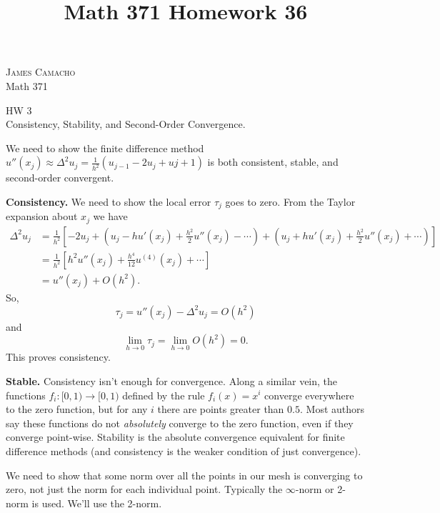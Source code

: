 \documentclass[12pt,oneside]{article}
\begin{document}
	\title{Math 371 Homework 36}
	
	\begin{flushright}
		\textsc{James Camacho}  \\
		Math 371
	\end{flushright}
	\begin{center}
		\textsf{HW 3} \\
		\textsf{Consistency, Stability, and Second-Order Convergence.}
	\end{center}

	We need to show the finite difference method $u''(x_j) \approx \Delta^2u_j =  \frac{1}{h^2}(u_{j-1} - 2u_j + u{j+1})$ is both consistent, stable, and second-order convergent.
	
	\textbf{Consistency.} We need to show the local error $\tau_j$ goes to zero. From the Taylor expansion about $x_j$ we have
	\begin{align*}
	\Delta^2u_j &= \frac{1}{h^2}\left[-2u_j + (u_j - hu'(x_j) + \frac{h^2}{2}u''(x_j) - \cdots) + (u_j + hu'(x_j) + \frac{h^2}{2}u''(x_j) + \cdots)\right]\\
	&= \frac{1}{h^2}\left[h^2u''(x_j) + \frac{h^4}{12}u^{(4)}(x_j) + \cdots\right]\\
	&= u''(x_j) + O(h^2).
	\end{align*}
	So,
	$$\tau_j = u''(x_j) - \Delta^2u_j = O(h^2)$$
	and
	$$\lim_{h\to 0} \tau_j = \lim_{h\to 0}O(h^2) = 0.$$
	This proves consistency.
	
	\textbf{Stable.} Consistency isn't enough for convergence. Along a similar vein, the functions $f_i: [0, 1)\to [0, 1)$ defined by the rule $f_i(x) = x^i$ converge everywhere to the zero function, but for any $i$ there are points greater than $0.5$. Most authors say these functions do not \emph{absolutely} converge to the zero function, even if they converge point-wise. Stability is the absolute convergence equivalent for finite difference methods (and consistency is the weaker condition of just convergence).
	
	We need to show that some norm over all the points in our mesh is converging to zero, not just the norm for each individual point. Typically the $\infty$-norm or 2-norm is used. We'll use the 2-norm.
	
\end{document}
